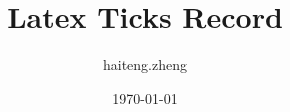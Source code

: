 

\title{Latex Ticks Record}
\author{haiteng.zheng}
\date{\today}


\maketitle
\tableofcontents






